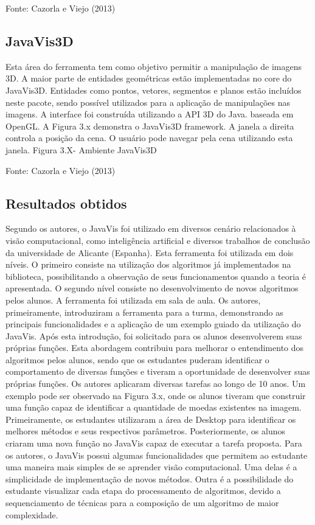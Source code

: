 \documentclass[
	12pt,				%
	oneside,			%
	a4paper,			%
	english,			%
	french,				%
	spanish,			%
	brazil,				%
	]{abntex2}
\begin{document}
Fonte: Cazorla e Viejo  (2013)

\subsection{JavaVis3D}

	Esta área do ferramenta tem como objetivo permitir a manipulação de imagens 3D. A maior parte de entidades geométricas estão implementadas no core do JavaVis3D. Entidades como pontos, vetores, segmentos e planos estão incluídos neste pacote, sendo possível utilizados para a aplicação de manipulações nas imagens. A interface foi construída utilizando a API 3D do Java. baseada em OpenGL.
A Figura 3.x demonstra o JavaVis3D framework. A janela a direita controla a posição da cena. O usuário pode navegar pela cena utilizando esta janela.
Figura 3.X- Ambiente JavaVis3D

Fonte: Cazorla e Viejo  (2013)

\subsection{Resultados obtidos}

	Segundo os autores, o JavaVis foi utilizado em diversos cenário relacionados à visão computacional, como inteligência artificial e diversos trabalhos de conclusão da universidade de Alicante (Espanha). Esta ferramenta foi utilizada em dois níveis. O primeiro consiste na utilização dos algoritmos já implementados na biblioteca, possibilitando a observação de seus funcionamentos quando a teoria é apresentada. O segundo nível consiste no desenvolvimento de novos algoritmos pelos alunos.
	A ferramenta foi utilizada em sala de aula. Os autores, primeiramente, introduziram a ferramenta para a turma, demonstrando as principais funcionalidades e a aplicação de um exemplo guiado da utilização do JavaVis. Após esta introdução, foi solicitado para os alunos desenvolverem suas próprias funções. Esta abordagem contribuiu para melhorar o entendimento dos algoritmos pelos alunos, sendo que os estudantes puderam identificar o comportamento de diversas funções e tiveram a oportunidade de desenvolver suas próprias funções.
	Os autores aplicaram diversas tarefas ao longo de 10 anos. Um exemplo pode ser observado na Figura 3.x, onde os alunos tiveram que construir uma função capaz de identificar a quantidade de moedas existentes na imagem. Primeiramente, os estudantes utilizaram a área de Desktop para identificar os melhores métodos e seus respectivos parâmetros. Posteriormente, os alunos criaram uma nova função no JavaVis capaz de executar a tarefa proposta.
	Para os autores, o JavaVis possui algumas funcionalidades que permitem ao estudante uma maneira mais simples de se aprender visão computacional. Uma delas é a simplicidade de implementação de novos métodos. Outra é a possibilidade do estudante visualizar cada etapa do processamento de algoritmos, devido a sequenciamento de técnicas para a composição de um algoritmo de maior complexidade.
\end{document}
